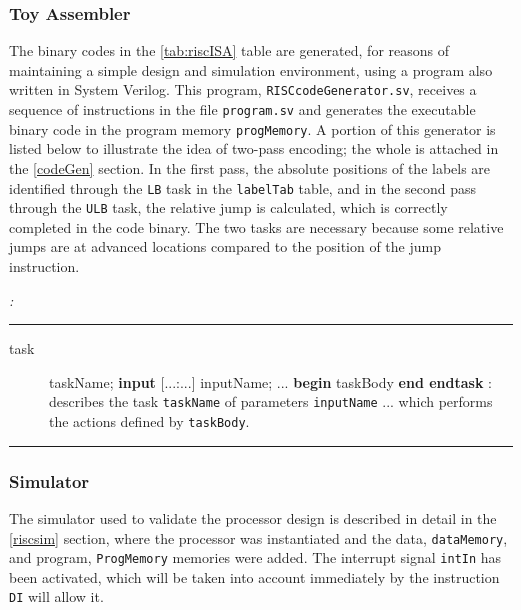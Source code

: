 \subsubsection{Toy Assembler}

The binary codes in the \ref{tab:riscISA} table are generated, for reasons of maintaining a simple design and simulation environment, using a program also written in System Verilog. This program, {\tt RISCcodeGenerator.sv}, receives a sequence of instructions in the file {\tt program.sv} and generates the executable binary code in the program memory {\tt progMemory}. A portion of this generator is listed below to illustrate the idea of two-pass encoding; the whole is attached in the \ref{codeGen} section. In the first pass, the absolute positions of the labels are identified through the {\tt LB} task in the {\tt labelTab} table, and in the second pass through the {\tt ULB} task, the relative jump is calculated, which is correctly completed in the code binary. The two tasks are necessary because some relative jumps are at advanced locations compared to the position of the jump instruction.


\begin{verisum}{\em :

\hspace{-0.8cm} \rule[5mm]{16cm}{0.25mm} \vspace{-0.7cm}

\begin{description}
    \item[task] taskName; {\bf input} [...:...] inputName; ... {\bf begin} taskBody {\bf end  endtask} : describes the task {\tt taskName} of parameters {\tt inputName} ... which performs the actions defined by {\tt taskBody}.
\end{description}
\rule[5mm]{16cm}{0.25mm} }
\end{verisum}

\subsubsection{Simulator}

The simulator used to validate the processor design is described in detail in the \ref{riscsim} section, where the processor was instantiated and the data, {\tt dataMemory}, and program, {\tt ProgMemory} memories were added. The interrupt signal {\tt intIn} has been activated, which will be taken into account immediately by the instruction {\tt DI} will allow it.


